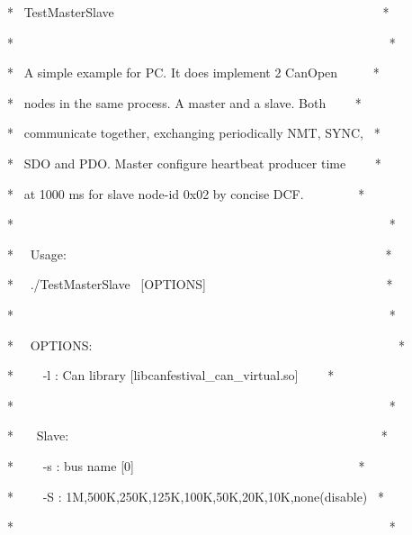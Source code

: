 \documentclass[12pt,twoside]{article}
\begin{document}
{\ttfamily
* \ TestMasterSlave
\ \ \ \ \ \ \ \ \ \ \ \ \ \ \ \ \ \ \ \ \ \ \ \ \ \ \ \ \ \ \ \ \ \ \ \ \ \ \ \ \ \ *}

{\ttfamily
*
\ \ \ \ \ \ \ \ \ \ \ \ \ \ \ \ \ \ \ \ \ \ \ \ \ \ \ \ \ \ \ \ \ \ \ \ \ \ \ \ \ \ \ \ \ \ \ \ \ \ \ \ \ \ \ \ \ \ \ *}

{\ttfamily
* \ A simple example for PC. It does implement 2 CanOpen \ \ \ \ \ *}

{\ttfamily
* \ nodes in the same process. A master and a slave. Both \ \ \ \ *}

{\ttfamily
* \ communicate together, exchanging periodically NMT, SYNC, \ *}

{\ttfamily
* \ SDO and PDO. Master configure heartbeat producer time \ \ \ \ *}

{\ttfamily
* \ at 1000 ms for slave node{}-id 0x02 by concise DCF.
\ \ \ \ \ \ \ \ *}

{\ttfamily
*
\ \ \ \ \ \ \ \ \ \ \ \ \ \ \ \ \ \ \ \ \ \ \ \ \ \ \ \ \ \ \ \ \ \ \ \ \ \ \ \ \ \ \ \ \ \ \ \ \ \ \ \ \ \ \ \ \ \ \ *}

{\ttfamily
* \ \ Usage:
\ \ \ \ \ \ \ \ \ \ \ \ \ \ \ \ \ \ \ \ \ \ \ \ \ \ \ \ \ \ \ \ \ \ \ \ \ \ \ \ \ \ \ \ \ \ \ \ \ \ *}

{\ttfamily
* \ \ ./TestMasterSlave \ [OPTIONS]
\ \ \ \ \ \ \ \ \ \ \ \ \ \ \ \ \ \ \ \ \ \ \ \ \ \ \ \ *}

{\ttfamily
*
\ \ \ \ \ \ \ \ \ \ \ \ \ \ \ \ \ \ \ \ \ \ \ \ \ \ \ \ \ \ \ \ \ \ \ \ \ \ \ \ \ \ \ \ \ \ \ \ \ \ \ \ \ \ \ \ \ \ \ *}

{\ttfamily
* \ \ OPTIONS:
\ \ \ \ \ \ \ \ \ \ \ \ \ \ \ \ \ \ \ \ \ \ \ \ \ \ \ \ \ \ \ \ \ \ \ \ \ \ \ \ \ \ \ \ \ \ \ \ *}

{\ttfamily
* \ \ \ \ {}-l : Can library
[{\textquotedbl}libcanfestival\_can\_virtual.so{\textquotedbl}]
\ \ \ \ *}

{\ttfamily
*
\ \ \ \ \ \ \ \ \ \ \ \ \ \ \ \ \ \ \ \ \ \ \ \ \ \ \ \ \ \ \ \ \ \ \ \ \ \ \ \ \ \ \ \ \ \ \ \ \ \ \ \ \ \ \ \ \ \ \ *}

{\ttfamily
* \ \ \ Slave:
\ \ \ \ \ \ \ \ \ \ \ \ \ \ \ \ \ \ \ \ \ \ \ \ \ \ \ \ \ \ \ \ \ \ \ \ \ \ \ \ \ \ \ \ \ \ \ \ \ *}

{\ttfamily
* \ \ \ \ {}-s : bus name [{\textquotedbl}0{\textquotedbl}]
\ \ \ \ \ \ \ \ \ \ \ \ \ \ \ \ \ \ \ \ \ \ \ \ \ \ \ \ \ \ \ \ \ \ \ *}

{\ttfamily
* \ \ \ \ {}-S : 1M,500K,250K,125K,100K,50K,20K,10K,none(disable) \ *}

{\ttfamily
*
\ \ \ \ \ \ \ \ \ \ \ \ \ \ \ \ \ \ \ \ \ \ \ \ \ \ \ \ \ \ \ \ \ \ \ \ \ \ \ \ \ \ \ \ \ \ \ \ \ \ \ \ \ \ \ \ \ \ \ *}
\end{document}
